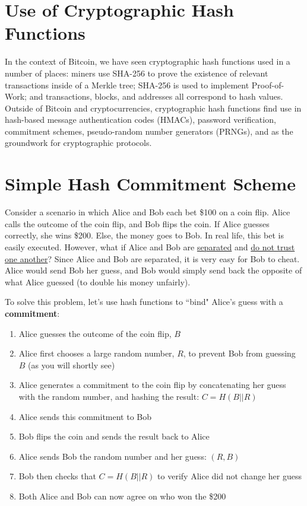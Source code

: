 \documentclass[11pt]{article}
\begin{document}
   \section*{Use of Cryptographic Hash Functions}
   
   In the context of Bitcoin, we have seen cryptographic hash functions used in a number of places: miners use SHA-256 to prove the existence of relevant transactions inside of a Merkle tree; SHA-256 is used to implement Proof-of-Work; and transactions, blocks, and addresses all correspond to hash values. Outside of Bitcoin and cryptocurrencies, cryptographic hash functions find use in hash-based message authentication codes (HMACs), password verification, commitment schemes, pseudo-random number generators (PRNGs), and as the groundwork for cryptographic protocols.
   
    \section*{Simple Hash Commitment Scheme}
   
    Consider a scenario in which Alice and Bob each bet \$100 on a coin flip. Alice calls the outcome of the coin flip, and Bob flips the coin. If Alice guesses correctly, she wins \$200. Else, the money goes to Bob. In real life, this bet is easily executed. However, what if Alice and Bob are \underline{separated} and \underline{do not trust one another}? Since Alice and Bob are separated, it is very easy for Bob to cheat. Alice would send Bob her guess, and Bob would simply send back the opposite of what Alice guessed (to double his money unfairly).
    
    To solve this problem, let's use hash functions to ``bind" Alice's guess with a \textbf{commitment}:
    
    \begin{enumerate}
        \item Alice guesses the outcome of the coin flip, $B$
        \item Alice first chooses a large random number, $R$, to prevent Bob from guessing $B$ (as you will shortly see)
        \item Alice generates a commitment to the coin flip by concatenating her guess with the random number, and hashing the result: $C = H(B||R)$
        \item Alice sends this commitment to Bob
        \item Bob flips the coin and sends the result back to Alice
        \item Alice sends Bob the random number and her guess: $(R, B)$
        \item Bob then checks that $C = H(B||R)$ to verify Alice did not change her guess
        \item Both Alice and Bob can now agree on who won the \$200
    \end{enumerate}
    
\end{document}
